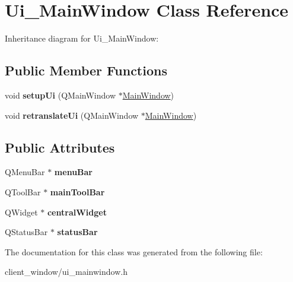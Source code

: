 \hypertarget{classUi__MainWindow}{}\section{Ui\+\_\+\+Main\+Window Class Reference}
\label{classUi__MainWindow}


Inheritance diagram for Ui\+\_\+\+Main\+Window\+:
\subsection*{Public Member Functions}
\begin{DoxyCompactItemize}
\item 
void {\bfseries setup\+Ui} (Q\+Main\+Window $\ast$\hyperlink{classMainWindow}{Main\+Window})\hypertarget{classUi__MainWindow_acf4a0872c4c77d8f43a2ec66ed849b58}{}\label{classUi__MainWindow_acf4a0872c4c77d8f43a2ec66ed849b58}

\item 
void {\bfseries retranslate\+Ui} (Q\+Main\+Window $\ast$\hyperlink{classMainWindow}{Main\+Window})\hypertarget{classUi__MainWindow_a097dd160c3534a204904cb374412c618}{}\label{classUi__MainWindow_a097dd160c3534a204904cb374412c618}

\end{DoxyCompactItemize}
\subsection*{Public Attributes}
\begin{DoxyCompactItemize}
\item 
Q\+Menu\+Bar $\ast$ {\bfseries menu\+Bar}\hypertarget{classUi__MainWindow_a2be1c24ec9adfca18e1dcc951931457f}{}\label{classUi__MainWindow_a2be1c24ec9adfca18e1dcc951931457f}

\item 
Q\+Tool\+Bar $\ast$ {\bfseries main\+Tool\+Bar}\hypertarget{classUi__MainWindow_a5172877001c8c7b4e0f6de50421867d1}{}\label{classUi__MainWindow_a5172877001c8c7b4e0f6de50421867d1}

\item 
Q\+Widget $\ast$ {\bfseries central\+Widget}\hypertarget{classUi__MainWindow_a30075506c2116c3ed4ff25e07ae75f81}{}\label{classUi__MainWindow_a30075506c2116c3ed4ff25e07ae75f81}

\item 
Q\+Status\+Bar $\ast$ {\bfseries status\+Bar}\hypertarget{classUi__MainWindow_a50fa481337604bcc8bf68de18ab16ecd}{}\label{classUi__MainWindow_a50fa481337604bcc8bf68de18ab16ecd}

\end{DoxyCompactItemize}


The documentation for this class was generated from the following file\+:\begin{DoxyCompactItemize}
\item 
client\+\_\+window/ui\+\_\+mainwindow.\+h\end{DoxyCompactItemize}

